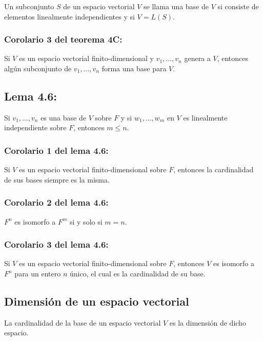 \documentclass{article}
\begin{document}
Un subconjunto $S$ de un espacio vectorial $V$ se llama una base de $V$ si consiste de elementos linealmente independientes y si $V=L(S)$.

\subsubsection*{\color{red} Corolario 3 del teorema 4C:}

Si $V$ es un espacio vectorial finito-dimensional y $v_1,\ldots,v_n$ genera a $V$, entonces algún subconjunto de $v_1,\ldots,v_n$ forma una base para $V$.

\subsection*{\color{blue} Lema 4.6:}

Si $v_1,\ldots,v_n$ es una base de $V$ sobre $F$ y si $w_1,\ldots,w_m$ en $V$ es linealmente independiente sobre $F$, entonces $m\leq n$.

\subsubsection*{\color{blue} Corolario 1 del lema 4.6:}

Si $V$ es un espacio vectorial finito-dimensional sobre $F$, entonces la cardinalidad de sus bases siempre es la misma. 

\subsubsection*{\color{blue} Corolario 2 del lema 4.6:}

$F^n$ es isomorfo a $F^m$ si y solo si $m=n$.

\subsubsection*{\color{blue} Corolario 3 del lema 4.6:}

Si $V$ es un espacio vectorial finito-dimensional sobre $F$, entonces $V$ es isomorfo a $F^n$ para un entero $n$ único, el cual es la cardinalidad de su base.

\subsection*{\color{violet} Dimensión de un espacio vectorial}

La cardinalidad de la base de un espacio vectorial $V$ es la dimensión de dicho espacio.
\end{document}
